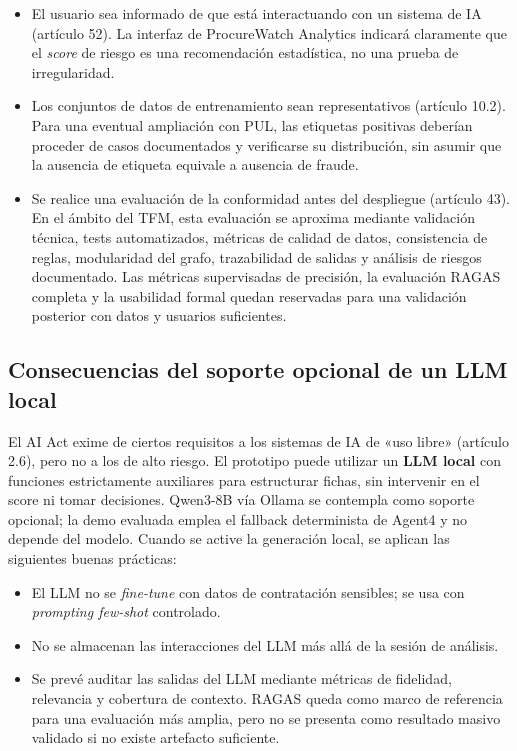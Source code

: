 \documentclass[11pt,a4paper,spanish]{book}
\numberwithin{equation}{chapter}
\numberwithin{figure}{chapter}
\begin{document}
\begin{itemize}
\item El usuario sea informado de que está interactuando con un sistema de IA (artículo 52). La interfaz de ProcureWatch Analytics indicará claramente que el \textit{score} de riesgo es una recomendación estadística, no una prueba de irregularidad.

\item Los conjuntos de datos de entrenamiento sean representativos (artículo 10.2). Para una eventual ampliación con PUL, las etiquetas positivas deberían proceder de casos documentados y verificarse su distribución, sin asumir que la ausencia de etiqueta equivale a ausencia de fraude.

\item Se realice una evaluación de la conformidad antes del despliegue (artículo 43). En el ámbito del TFM, esta evaluación se aproxima mediante validación técnica, tests automatizados, métricas de calidad de datos, consistencia de reglas, modularidad del grafo, trazabilidad de salidas y análisis de riesgos documentado. Las métricas supervisadas de precisión, la evaluación RAGAS completa y la usabilidad formal quedan reservadas para una validación posterior con datos y usuarios suficientes.
\end{itemize}

\subsection{Consecuencias del soporte opcional de un LLM local}

El AI Act exime de ciertos requisitos a los sistemas de IA de «uso libre» (artículo 2.6), pero no a los de alto riesgo. El prototipo puede utilizar un \textbf{LLM local} con funciones estrictamente auxiliares para estructurar fichas, sin intervenir en el score ni tomar decisiones. Qwen3-8B v{\'i}a Ollama se contempla como soporte opcional; la demo evaluada emplea el fallback determinista de Agent4 y no depende del modelo. Cuando se active la generaci{\'o}n local, se aplican las siguientes buenas pr{\'a}cticas:

\begin{itemize}
\item El LLM no se \textit{fine-tune} con datos de contratación sensibles; se usa con \textit{prompting few-shot} controlado.
\item No se almacenan las interacciones del LLM más allá de la sesión de análisis.
\item Se prevé auditar las salidas del LLM mediante métricas de fidelidad, relevancia y cobertura de contexto. RAGAS queda como marco de referencia para una evaluación más amplia, pero no se presenta como resultado masivo validado si no existe artefacto suficiente.
\end{itemize}
\end{document}
